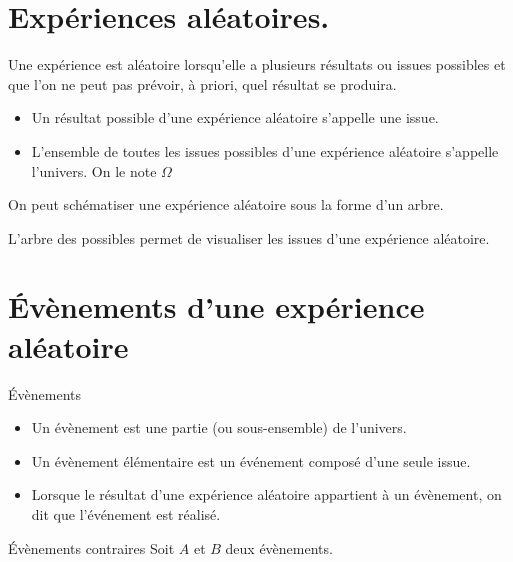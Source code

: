 \begin{pageCours} %


\section{Expériences aléatoires.}

\begin{Def}
Une expérience est aléatoire lorsqu'elle a plusieurs résultats ou issues possibles et que l'on ne peut pas prévoir, à priori, quel résultat se produira.
\end{Def}

\begin{Def}
\begin{itemize}
\item Un résultat possible d'une expérience aléatoire s'appelle une issue.
\item L'ensemble de toutes les issues possibles d'une expérience aléatoire s'appelle l'univers. On le note $\Omega$
\end{itemize}
\end{Def}

\begin{Def}
On peut schématiser une expérience aléatoire sous la forme d'un arbre.

L'arbre des possibles permet de visualiser les issues d'une expérience aléatoire.
\end{Def}

\section{Évènements d'une expérience aléatoire}

\begin{DefT}{Évènements}
\begin{itemize}
\item Un évènement est une partie (ou sous-ensemble) de l'univers.
\item Un évènement élémentaire est un événement composé d'une seule issue.
\item Lorsque le résultat d'une expérience aléatoire appartient à un évènement, on dit que l'événement est réalisé.
\end{itemize}
\end{DefT}

\begin{DefT}{Évènements contraires}
Soit $A$ et $B$ deux évènements.


\end{DefT}
\end{pageCours}
